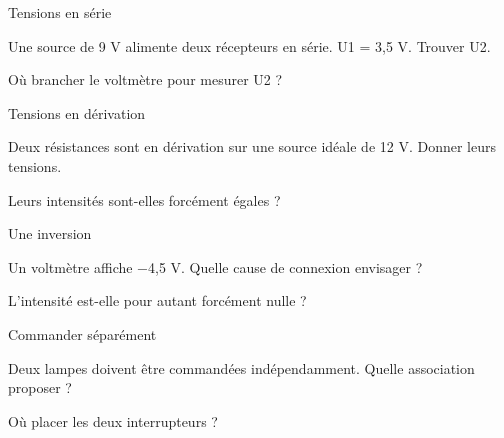 \par\noindent\begin{minipage}{\linewidth}
\begin{exercice}[2]{Tensions en série}
\begin{questions}
\item Une source de 9 V alimente deux récepteurs en série. U1 = 3,5 V. Trouver U2.
\item Où brancher le voltmètre pour mesurer U2 ?
\end{questions}
\end{exercice}
\end{minipage}
\par\noindent\begin{minipage}{\linewidth}
\begin{exercice}[2]{Tensions en dérivation}
\begin{questions}
\item Deux résistances sont en dérivation sur une source idéale de 12 V. Donner leurs tensions.
\item Leurs intensités sont-elles forcément égales ?
\end{questions}
\end{exercice}
\end{minipage}
\par\noindent\begin{minipage}{\linewidth}
\begin{exercice}[2]{Une inversion}
\begin{questions}
\item Un voltmètre affiche −4,5 V. Quelle cause de connexion envisager ?
\item L’intensité est-elle pour autant forcément nulle ?
\end{questions}
\end{exercice}
\end{minipage}
\par\noindent\begin{minipage}{\linewidth}
\begin{exercice}[2]{Commander séparément}
\begin{questions}
\item Deux lampes doivent être commandées indépendamment. Quelle association proposer ?
\item Où placer les deux interrupteurs ?
\end{questions}
\end{exercice}
\end{minipage}
\clearpage{}
